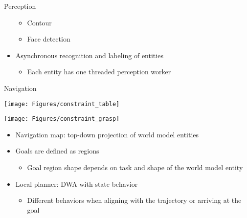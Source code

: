 \documentclass[a4paper,12pt]{article}
\newcommand{\emptylogo}{\texttt{[image: Figures/Empty]}}
\begin{document}
\begin{slidetop}
\begin{multicols}{2}
\begin{bclogo}[couleur = white, arrondi = 0.25, couleurBord = tuedarkblue, epBarre = 0, logo=\emptylogo]{\textcolor{tuedarkblue}{Perception}}
\begin{itemize}[itemsep = 0pt, parsep = 0pt, leftmargin=15pt]
\begin{itemize}[itemsep = 0pt, parsep = 0pt, leftmargin=15pt]
		\item Contour
		\item Face detection
	\end{itemize}
	\item Asynchronous recognition and labeling of entities 
	\begin{itemize}[itemsep = 0pt, parsep = 0pt, leftmargin=15pt]
		\item Each entity has one threaded perception worker
	\end{itemize}
\end{itemize}
\end{bclogo}
\vfill
\begin{bclogo}[couleur = white, arrondi = 0.25, couleurBord = tuedarkblue, epBarre = 0, logo=\emptylogo]{\textcolor{tuedarkblue}{Navigation}}
\bigskip
\begin{minipage}[T]{0.48\textwidth}
    \begin{center}
        \texttt{[image: Figures/constraint\_table]}
    \end{center}
\end{minipage}
\hfill
\begin{minipage}[T]{0.48\textwidth}
    \begin{center}
        \texttt{[image: Figures/constraint\_grasp]}
    \end{center}
\end{minipage}
\begin{itemize}[itemsep = 0pt, parsep = 0pt, leftmargin=15pt]
	\item Navigation map: top-down projection of world model entities
    \item Goals are defined as regions
    \begin{itemize}[itemsep = 0pt, parsep = 0pt, leftmargin=15pt]
    	\item Goal region shape depends on task and shape of the world model entity
    \end{itemize}
    \item Local planner: DWA with state behavior
    \begin{itemize}[itemsep = 0pt, parsep = 0pt, leftmargin=15pt]
    	\item Different behaviors when aligning with the trajectory or arriving at the goal
    \end{itemize}
\end{itemize}

\end{bclogo}
%
\end{multicols}
\end{slidetop}
\end{document}
